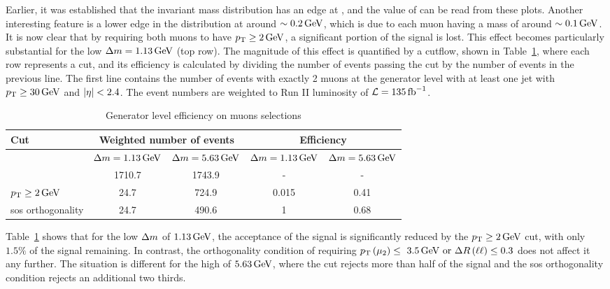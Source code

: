 Earlier, it was established that the invariant mass distribution has an edge at \dm, and the value of \dm can be read from these plots. Another interesting feature is a lower edge in the \dm distribution at around $\sim 0.2\,\text{Ge\hspace{-.08em}V}$, which is due to each muon having a mass of around $\sim 0.1\,\text{Ge\hspace{-.08em}V}$. It is now clear that by requiring both muons to have $p_{\mathrm{T}}\geq 2\,\text{Ge\hspace{-.08em}V}$, a significant portion of the signal is lost. This effect becomes particularly substantial for the low $\Delta m=1.13\,\text{Ge\hspace{-.08em}V}$ (top row). The magnitude of this effect is quantified by a cutflow, shown in Table~\ref{tab:gen-muon-pt-dr-efficiency}, where each row represents a cut, and its efficiency is calculated by dividing the number of events passing the cut by the number of events in the previous line. The first line contains the number of events with exactly 2 muons at the generator level with at least one jet with $p_{\mathrm{T}} \geq 30\,\text{Ge\hspace{-.08em}V}$ and $\abs{\eta}<2.4$. The event numbers are weighted to Run II luminosity of $\mathcal{L} = 135 \mbox{\ensuremath{\,\text{fb}^{-1}}}$.

\begin{table}[!htb]
	\centering
	\label{tab:gen-muon-pt-dr-efficiency}
		\caption{Generator level efficiency on muons selections}
			\begin{tabular}{l|cc|cc} \hline
			Cut & \multicolumn{2}{c|}{Weighted number of events} & \multicolumn{2}{c}{Efficiency} \\ \hline
			
			 & $\Delta m=1.13\,\text{Ge\hspace{-.08em}V}$ & $\Delta m=5.63\,\text{Ge\hspace{-.08em}V}$ & $\Delta m=1.13\,\text{Ge\hspace{-.08em}V}$ & $\Delta m=5.63\,\text{Ge\hspace{-.08em}V}$ \\
			 & 1710.7 & 1743.9 & - & -\\
			$p_{\mathrm{T}}\geq 2\,\text{Ge\hspace{-.08em}V}$ & 24.7 & 724.9 & 0.015 & 0.41\\
			\gls{sos} orthogonality & 24.7 & 490.6 & 1 & 0.68 \\ \hline
			\end{tabular}
\end{table}

Table~\ref{tab:gen-muon-pt-dr-efficiency} shows that for the low $\Delta m$ of $1.13\,\text{Ge\hspace{-.08em}V}$, the acceptance of the signal is significantly reduced by the $p_{\mathrm{T}}\geq 2\,\text{Ge\hspace{-.08em}V}$ cut, with only $1.5\%$ of the signal remaining. In contrast, the orthogonality condition of requiring $p_{\mathrm{T}}\left(\mu_2\right)\leq~3.5\,\text{Ge\hspace{-.08em}V}\text{ or }\Delta R\left(\ell\ell\right)\leq 0.3$ does not affect it any further. The situation is different for the high \dm of $5.63\,\text{Ge\hspace{-.08em}V}$, where the \pt cut rejects more than half of the signal and the \gls{sos} orthogonality condition rejects an additional two thirds.

